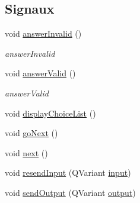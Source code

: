 \subsection*{Signaux}
\begin{DoxyCompactItemize}
\item 
void \hyperlink{classSH__QuestionState_a3348a8a683130678ac87a10ba2a25486}{answer\-Invalid} ()
\begin{DoxyCompactList}\small\item\em answer\-Invalid \end{DoxyCompactList}\item 
void \hyperlink{classSH__QuestionState_a04e259643788d15ab6244bc8a04286d6}{answer\-Valid} ()
\begin{DoxyCompactList}\small\item\em answer\-Valid \end{DoxyCompactList}\item 
void \hyperlink{classSH__DatabaseContentQuestionState_acc79a171c2a70d52120676329a132dc4}{display\-Choice\-List} ()
\item 
void \hyperlink{classSH__GenericState_a34c1bebc765cc3a62d66c94c37d4f0c3}{go\-Next} ()
\item 
void \hyperlink{classSH__GenericState_ad5e2a1f3dc129336c8f529cf897c2eb0}{next} ()
\item 
void \hyperlink{classSH__InOutState_a1f00480afefd173002cf56d4c4128048}{resend\-Input} (Q\-Variant \hyperlink{classSH__InOutState_a8e1b78069343122df7713624a1a5a100}{input})
\item 
void \hyperlink{classSH__InOutState_a77921c5f42059bc97361f4ff7827da12}{send\-Output} (Q\-Variant \hyperlink{classSH__InOutState_a17ed7eaf5e3ed5af80a4f9fe65d5bfd9}{output})
\end{DoxyCompactItemize}
